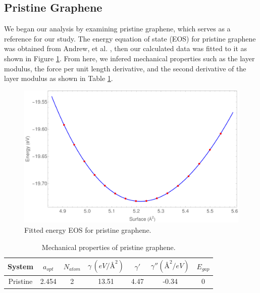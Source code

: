 \documentclass{article}
\begin{document}
\subsection{Pristine Graphene}
We began our analysis by examining pristine graphene, which serves as a reference for our study. The energy equation of state (EOS) for pristine graphene was obtained from Andrew, et al. \cite{Andrew2012}, then our calculated data was fitted to it as shown in Figure \ref{fig:pristine_eos}. From here, we infered mechanical properties such as the layer modulus, the force per unit length derivative, and the second derivative of the layer modulus as shown in Table \ref{table:eos}.

\begin{figure}[H]
  \centering
  \includegraphics[scale=0.3]{../figures/p_eos.pdf}  
  \caption{Fitted energy EOS for pristine graphene.}
  \label{fig:pristine_eos}
\end{figure}

\begin{table}[]
  \centering
  \caption{Mechanical properties of pristine graphene.}
  \begin{tabular}{@{}ccccccc@{}}
  \toprule
  \textbf{System} & $a_{opt}$ & $N_{atom}$ & $\gamma \, (eV/\si{\angstrom}^2)$ & $\gamma'$ & $\gamma'' (\si{\angstrom}^2/ eV)$ & $E_{gap}$  \\ \midrule
  Pristine        & 2.454            & 2              & 13.51                  & 4.47             & -0.34  & 0              \\
  \end{tabular}
  \label{table:eos}
\end{table}
\end{document}
